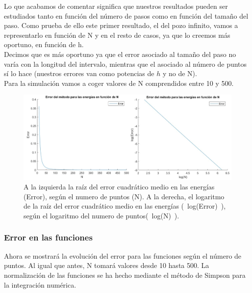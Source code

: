 \documentclass[12pt]{article}
\begin{document}
    Lo que acabamos de comentar significa que nuestros resultados pueden ser estudiados tanto en función del número de pasos como en función del tamaño del paso. Como prueba de ello este primer resultado, el del pozo infinito, vamos a representarlo en función de N y en el resto de casos, ya que lo creemos más oportuno, en función de h.\\ 

    Decimos que es más oportuno ya que el error asociado al tamaño del paso no varía con la longitud del intervalo, mientras que el asociado al número de puntos sí lo hace (nuestros errores van como potencias de $h$ y no de N).\\
    
    Para la simulación vamos a coger valores de N comprendidos entre 10 y 500.\\

\begin{figure}[H]
    \centering
    \begin{adjustbox}{width=1.2\linewidth,center}
        \includegraphics{fotos/comperror_energias_infinito.png}
    \end{adjustbox}
    \caption{A la izquierda la raíz del error cuadrático medio en las energías (Error), según el numero de puntos (N). A la derecha, el logaritmo de la raíz del error cuadrático medio en las energías (~log(Error)~), según el logaritmo del numero de puntos(~log(N)~).}
\end{figure}

\subsubsection{Error en las funciones}
Ahora se mostrará la evolución del error 
para las funciones según el número de puntos. 
Al igual que antes, N tomará valores desde 10 hasta 500.
La normalización de las funciones se ha hecho mediante 
el método de Simpson para la integración numérica.\\
\end{document}
